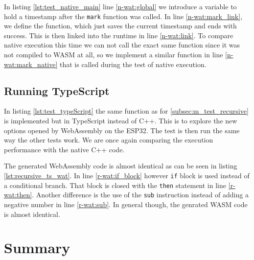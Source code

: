 

In listing \ref{lst:test_native_main} line \ref{n-wat:global} we introduce a variable to hold a timestamp after the \lstinline{mark} function was called. In line \ref{n-wat:mark_link}, we define the function, which just saves the current timestamp and ends with success. This is then linked into the runtime in line \ref{n-wat:link}. To compare native execution this time we can not call the exact same function since it was not compiled to WASM at all, so we implement a similar function in line \ref{n-wat:mark_native} that is called during the test of native execution.

\subsection{Running TypeScript}\label{subsec:typeScript}

In listing \ref{lst:test_typeScript} the same function as for \ref{subsec:m_test_recursive} is implemented but in TypeScript instead of C++. This is to explore the new options opened by WebAssembly on the ESP32. The test is then run the same way the other tests work. We are once again comparing the execution performance with the native C++ code.



The generated WebAssembly code is almost identical as can be seen in listing \ref{lst:recursive_ts_wat}. In line \ref{r-wat:if_block} however \lstinline{if} block is used instead of a conditional branch. That block is closed with the \lstinline{then} statement in line \ref{r-wat:then}. Another difference is the use of the \lstinline{sub} instruction instead of adding a negative number in line \ref{r-wat:sub}. In general though, the genrated WASM code is almost identical.



\section{Summary}
